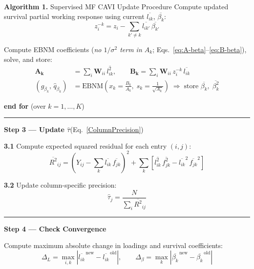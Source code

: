 \documentclass{article}[12pt]
\begin{document}
\begin{algobox}{\textbf{Algorithm 1.} Supervised MF CAVI Update Procedure}
\medskip
\hspace{3em}Compute updated survival partial working response using current $\overline{l_{ik}}$, $\overline{\beta_k}$:
\[
    z_i^{-k} = z_i - \sum_{k'\neq k}\overline{l_{ik'}}\,\overline{\beta_{k'}}
\]

\hspace{3em}Compute EBNM coefficients (\textit{no $1/\sigma^2$ term in $A_k$}; Eqs.~\ref{eq:A-beta}--\ref{eq:B-beta}), solve, and store:
\begin{align*}
    \mathbf{A_k} &= \sum_i \mathbf{W}_{ii}\,\overline{l_{ik}^2},
    \qquad
    \mathbf{B_k} = \sum_i \mathbf{W}_{ii}\,z_i^{-k}\,\overline{l_{ik}}\\
    \left(\hat{g}_{\beta_k},\,\hat{q}_{\beta_k}\right)
    &= \mathrm{EBNM}\!\left(x_k = \tfrac{B_k}{A_k},\; s_k = \tfrac{1}{\sqrt{A_k}}\right)
    \;\Rightarrow\;\text{store }\overline{\beta_k},\; \overline{\beta_k^2}
\end{align*}

\medskip
\hspace{1em}\textbf{end for} (over $k = 1,\ldots,K$)

\medskip
\hrule
\medskip

\hspace{1em}\textbf{Step 3 --- Update $\hat{\tau}$}\quad(Eq.~\ref{ColumnPrecision})

\medskip
\hspace{2em}\textbf{3.1}\hspace{0.5em} Compute expected squared residual for each entry $(i,j)$:
\[
    \overline{R^2}_{ij} = \!\left(Y_{ij} - \sum_k \overline{l_{ik}}\,\overline{f_{jk}}\right)^{\!2}
                         + \sum_k\!\left[\overline{l^{2}_{ik}}\,\overline{f^{2}_{jk}}
                           - \overline{l_{ik}}^2\,\overline{f_{jk}}^2\right]
\]

\hspace{2em}\textbf{3.2}\hspace{0.5em} Update column-specific precision:
\[
    \hat{\tau}_j = \frac{N}{\displaystyle\sum_i \overline{R^2}_{ij}}
\]

\medskip
\hrule
\medskip

\hspace{1em}\textbf{Step 4 --- Check Convergence}

\medskip
\hspace{2em}Compute maximum absolute change in loadings and survival coefficients:
\[
    \Delta_L = \max_{i,k}\left|\overline{l_{ik}}^{\,\text{new}} - \overline{l_{ik}}^{\,\text{old}}\right|,
    \qquad
    \Delta_\beta = \max_{k}\left|\overline{\beta_k}^{\,\text{new}} - \overline{\beta_k}^{\,\text{old}}\right|
\]


\end{algobox}
\end{document}
